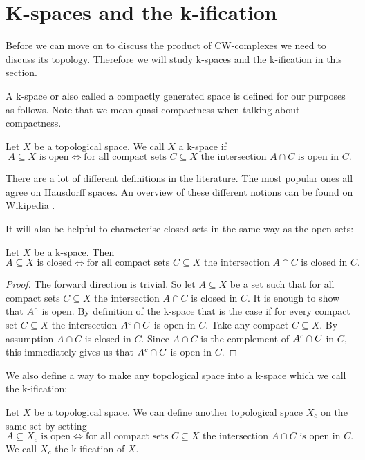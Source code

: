 \section{K-spaces and the k-ification}

Before we can move on to discuss the product of CW-complexes we need to discuss its topology.
Therefore we will study k-spaces and the k-ification in this section.

A k-space or also called a compactly generated space is defined for our purposes as follows. 
Note that we mean quasi-compactness when talking about compactness.

\begin{defi}
    Let $X$ be a topological space. 
    We call $X$ a k-space if 
    \[A \subseteq X \text{ is open} \iff \text{for all compact sets } C \subseteq X \text{ the intersection } A \cap C \text{ is open in } C.\]
\end{defi}

There are a lot of different definitions in the literature. 
The most popular ones all agree on Hausdorff spaces. 
An overview of these different notions can be found on Wikipedia \cite{Wikipedia2024}.

It will also be helpful to characterise closed sets in the same way as the open sets: 

\begin{lem}\label{lem:closediffinkspace}
    Let $X$ be a k-space. 
    Then 
    \[A \subseteq X \text{ is closed} \iff \text{for all compact sets } C \subseteq X \text{ the intersection } A \cap C \text{ is closed in } C.\]
\end{lem}
\begin{proof}
    The forward direction is trivial. 
    So let $A \subseteq X$ be a set such that for all compact sets $C \subseteq X$ the intersection $A \cap C$ is closed in $C$. 
    It is enough to show that $A^{c}$ is open. 
    By definition of the k-space that is the case if for every compact set $C \subseteq X$ the intersection $A^{c} \cap C$ is open in $C$. 
    Take any compact $C \subseteq X$.
    By assumption $A \cap C$ is closed in $C$.
    Since $A \cap C$ is the complement of $A^{c} \cap C$ in $C$, this immediately gives us that $A^{c} \cap C$ is open in $C$.
\end{proof}

We also define a way to make any topological space into a k-space which we call the k-ification: 

\begin{defi}
    Let $X$ be a topological space. 
    We can define another topological space $X_c$ on the same set by setting
    \[A \subseteq X_c \text{ is open} \iff \text{for all compact sets } C \subseteq X \text{ the intersection } A \cap C \text{ is open in } C.\]
    We call $X_c$ the k-ification of $X$.
\end{defi}

